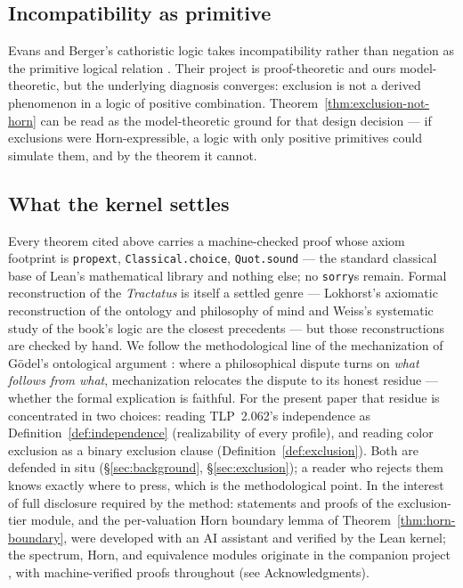 \documentclass[10pt, letterpaper]{article}
\theoremstyle{remark}
\newcommand{\lean}[1]{\texttt{#1}}
\newcommand{\TLP}[1]{TLP~#1}
\begin{document}
\subsection{Incompatibility as primitive}

Evans and Berger's cathoristic logic takes incompatibility rather than
negation as the primitive logical relation \cite{evans2014}. Their project is
proof-theoretic and ours model-theoretic, but the underlying diagnosis
converges: exclusion is not a derived phenomenon in a logic of positive
combination. Theorem~\ref{thm:exclusion-not-horn} can be read as the
model-theoretic ground for that design decision --- if exclusions were
Horn-expressible, a logic with only positive primitives could simulate them,
and by the theorem it cannot.

\subsection{What the kernel settles}

Every theorem cited above carries a machine-checked proof whose axiom
footprint is \lean{propext}, \lean{Classical.choice}, \lean{Quot.sound} ---
the standard classical base of Lean's mathematical library and nothing else;
no \lean{sorry}s remain. Formal reconstruction of the \emph{Tractatus} is
itself a settled genre --- Lokhorst's axiomatic reconstruction of the
ontology and philosophy of mind \cite{lokhorst1988} and Weiss's systematic
study of the book's logic \cite{weiss2017} are the closest precedents ---
but those reconstructions are checked by hand. We follow the methodological
line of the mechanization of G\"odel's ontological argument
\cite{benzmuller2014}: where a philosophical dispute turns on \emph{what
follows from what}, mechanization relocates the dispute to its honest
residue --- whether the formal explication is faithful. For the present paper that residue is concentrated
in two choices: reading \TLP{2.062}'s independence as
Definition~\ref{def:independence} (realizability of every profile), and
reading color exclusion as a binary exclusion clause
(Definition~\ref{def:exclusion}). Both are defended in situ
(\S\ref{sec:background}, \S\ref{sec:exclusion}); a reader who rejects them
knows exactly where to press, which is the methodological point. In the
interest of full disclosure required by the method: statements and proofs of
the exclusion-tier module, and the per-valuation Horn boundary lemma of
Theorem~\ref{thm:horn-boundary}, were developed with an AI assistant and
verified by the Lean kernel; the spectrum, Horn, and equivalence modules
originate in the companion project \cite{companion2026}, with
machine-verified proofs throughout (see Acknowledgments).
\end{document}
